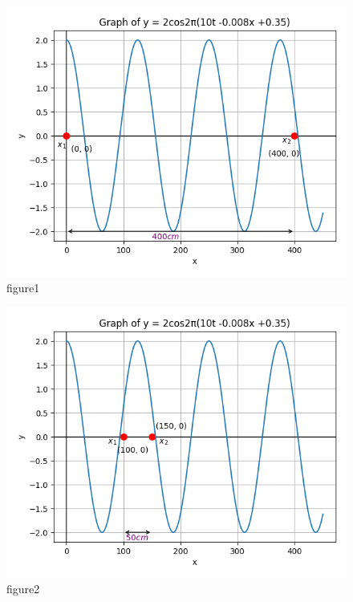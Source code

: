 \documentclass[journal,12pt,twocolumn]{IEEEtran}
\theoremstyle{remark}
\begin{document}
\begin{figure}[!h] 
\centering
\includegraphics[width=\linewidth]{figs/graph_1.png}
\captionsetup{justification=centering}
\caption{figure1}
\label{Solution}
\end{figure}

\begin{figure}[!h] 
\centering
\includegraphics[width=\linewidth]{figs/graph_2.png}
\captionsetup{justification=centering}
\caption{figure2}
\label{Solution}
\end{figure}
\end{document}
